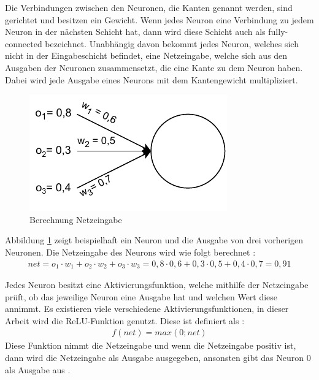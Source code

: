 Die Verbindungen zwischen den Neuronen, die Kanten genannt werden, sind gerichtet und besitzen ein Gewicht. Wenn jedes Neuron eine Verbindung zu jedem Neuron in der nächsten Schicht hat, 
dann wird diese Schicht auch als fully-connected bezeichnet. Unabhängig davon bekommt jedes Neuron, welches sich nicht in der Eingabeschicht befindet, eine Netzeingabe, 
welche sich aus den Ausgaben der Neuronen zusammensetzt, die eine Kante zu dem Neuron haben. Dabei wird jede Ausgabe eines Neurons mit dem Kantengewicht multipliziert.

\begin{figure}[H]
    \centering
    \includegraphics[width=\textwidth/2]{abbildungen/Aktivierungsfunktion.pdf}
    \caption{Berechnung Netzeingabe \cite[vgl. S.29]{NN}}
    \label{fig:Aktivierungsfunktion}
\end{figure}

Abbildung \ref*{fig:Aktivierungsfunktion} zeigt beispielhaft ein Neuron und die Ausgabe von drei vorherigen Neuronen. Die Netzeingabe des Neurons wird wie folgt berechnet \cite[S.29]{NN}:
\begin{align}
    net = o_{1} \cdot w_{1} + o_{2} \cdot w_{2} + o_{3} \cdot w_{3} = 0,8 \cdot 0,6 + 0,3 \cdot 0,5 + 0,4 \cdot 0,7 = 0,91
\end{align}

Jedes Neuron besitzt eine Aktivierungsfunktion, welche mithilfe der Netzeingabe prüft, ob das jeweilige Neuron eine Ausgabe hat und welchen Wert diese annimmt. Es existieren viele
verschiedene Aktivierungsfunktionen, in dieser Arbeit wird die \ac{ReLU}-Funktion genutzt. Diese ist definiert als \cite[S.31]{NN}:
\begin{align}
    f(net) = max(0; net)
\end{align}
Diese Funktion nimmt die Netzeingabe und wenn die Netzeingabe positiv ist, dann wird die Netzeingabe als Ausgabe ausgegeben, ansonsten gibt das Neuron 0 als Ausgabe aus \cite[vgl. S.31]{NN}.